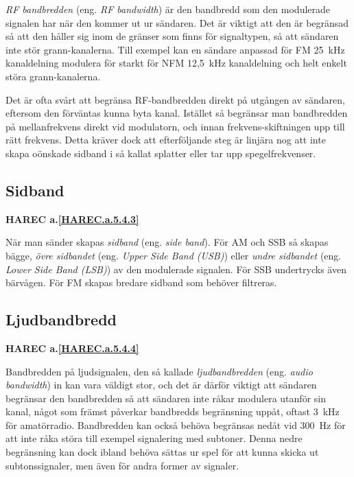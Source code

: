 \emph{RF bandbredden} (eng. \emph{RF bandwidth}) är den bandbredd som den
modulerade signalen har när den kommer ut ur sändaren.
Det är viktigt att den är begränsad så att den håller sig inom de gränser
som finns för signaltypen, så att sändaren inte stör grann-kanalerna.
Till exempel kan en sändare anpassad för FM 25~kHz kanaldelning modulera för starkt för
NFM 12,5~kHz kanaldelning och helt enkelt störa grann-kanalerna.

Det är ofta svårt att begränsa RF-bandbredden direkt på utgången av sändaren,
eftersom den förväntas kunna byta kanal.
Istället så begränsar man bandbredden på mellanfrekvens direkt vid modulatorn,
och innan frekvens-skiftningen upp till rätt frekvens.
Detta kräver dock att efterföljande steg är linjära nog att inte skapa oönskade
sidband i så kallat splatter eller tar upp spegelfrekvenser.

\subsection{Sidband}
\textbf{HAREC
  a.\ref{HAREC.a.5.4.3}\label{myHAREC.a.5.4.3}
}

När man sänder skapas \emph{sidband} (eng. \emph{side band}).
För AM och SSB så skapas bägge, \emph{övre sidbandet}
(eng. \emph{Upper Side Band (USB)}) eller \emph{undre sidbandet}
(eng. \emph{Lower Side Band (LSB)}) av den modulerade signalen.
För SSB undertrycks även bärvågen.
För FM skapas bredare sidband som behöver filtreras.

\subsection{Ljudbandbredd}
\textbf{HAREC
  a.\ref{HAREC.a.5.4.4}\label{myHAREC.a.5.4.4}
}

Bandbredden på ljudsignalen, den så kallade \emph{ljudbandbredden} (eng.
\emph{audio bandwidth}) in kan vara väldigt stor, och det är därför viktigt
att sändaren begränsar den bandbredden så att sändaren inte råkar modulera
utanför sin kanal, något som främst påverkar bandbredds begränsning uppåt,
oftast 3~kHz för amatörradio.
Bandbredden kan också behöva begränsas nedåt vid 300~Hz för att inte råka
störa till exempel signalering med subtoner.
Denna nedre begränsning kan dock ibland behöva sättas ur spel för att
kunna skicka ut subtonssignaler, men även för andra former av signaler.


